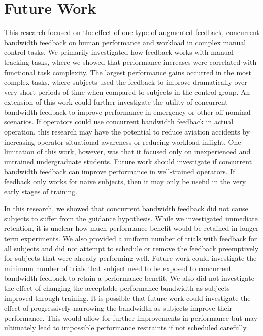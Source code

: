 \section{Future Work}

This research focused on the effect of one type of augmented feedback, concurrent bandwidth feedback on human performance and workload in complex manual control tasks.
We primarily investigated how feedback works with manual tracking tasks, where we showed that performance increases were correlated with functional task complexity.
The largest performance gains occurred in the most complex tasks, where subjects used the feedback to improve dramatically over very short periods of time when compared to subjects in the control group.
An extension of this work could further investigate the utility of concurrent bandwidth feedback to improve performance in emergency or other off-nominal scenarios.
If operators could use concurrent bandwidth feedback in actual operation, this research may have the potential to reduce aviation accidents by increasing operator situational awareness or reducing workload inflight.
One limitation of this work, however, was that it focused only on inexperienced and untrained undergraduate students.
Future work should investigate if concurrent bandwidth feedback can improve performance in well-trained operators.
If feedback only works for naive subjects, then it may only be useful in the very early stages of training.

In this research, we showed that concurrent bandwidth feedback did not cause subjects to suffer from the guidance hypothesis.
While we investigated immediate retention, it is unclear how much performance benefit would be retained in longer term experiments.
We also provided a uniform number of trials with feedback for all subjects and did not attempt to schedule or remove the feedback preemptively for subjects that were already performing well.
Future work could investigate the minimum number of trials that subject need to be exposed to concurrent bandwidth feedback to retain a performance benefit.
We also did not investigate the effect of changing the acceptable performance bandwidth as subjects improved through training.
It is possible that future work could investigate the effect of progressively narrowing the bandwidth as subjects improve their performance.
This would allow for further improvements in performance but may ultimately lead to impossible performance restraints if not scheduled carefully.

